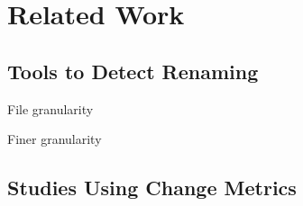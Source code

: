 \section{Related Work}
\label{sec:rw}

\subsection{Tools to Detect Renaming}

File granularity \cite{antoniol_automatic_2004,lavoie_inferring_2012,steidl_incremental_2014}

Finer granularity \cite{godfrey_using_2005,wu_aura:_2010,kim_when_2005}

\subsection{Studies Using Change Metrics}

\cite{graves_predicting_2000,eick_does_2001,nagappan_use_2005,weyuker_too_2008,moser_comparative_2008,matsumoto_analysis_2010,bird_dont_2011,dambros_evaluating_2012,illes-seifert_exploring_2010,posnett_dual_2013}

